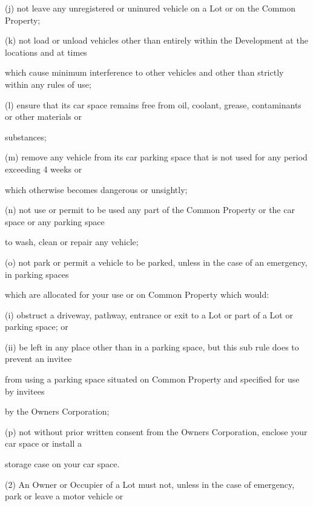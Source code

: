 \documentclass{article}
\begin{document}
{\fontsize{9.962}{1}(j) not leave any unregistered or uninured vehicle on a Lot or on the Common Property; }

{\fontsize{9.962}{1}(k) not load or unload vehicles other than entirely within the Development at the locations and at times }

{\fontsize{10.02}{1}which cause minimum interference to other vehicles and other than strictly within any rules of use; }

\newpage

{\fontsize{9.962}{1}(l) ensure that its car space remains free from oil, coolant, grease, contaminants or other materials or }

{\fontsize{10.02}{1}substances; }

{\fontsize{9.962}{1}(m) remove any vehicle from its car parking space that is not used for any period exceeding 4 weeks or }

{\fontsize{10.02}{1}which otherwise becomes dangerous or unsightly; }

{\fontsize{9.962}{1}(n) not use or permit to be used any part of the Common Property or the car space or any parking space }

{\fontsize{10.02}{1}to wash, clean or repair any vehicle; }

{\fontsize{9.962}{1}(o) not park or permit a vehicle to be parked, unless in the case of an emergency, in parking spaces }

{\fontsize{10.02}{1}which are allocated for your use or on Common Property which would: }

{\fontsize{9.962}{1}(i) obstruct a driveway, pathway, entrance or exit to a Lot or part of a Lot or parking space; or }

{\fontsize{9.962}{1}(ii) be left in any place other than in a parking space, but this sub rule does to prevent an invitee }

{\fontsize{10.02}{1}from using a parking space situated on Common Property and specified for use by invitees }

{\fontsize{10.02}{1}by the Owners Corporation; }

{\fontsize{9.962}{1}(p) not without prior written consent from the Owners Corporation, enclose your car space or install a }

{\fontsize{10.02}{1}storage case on your car space. }

{\fontsize{9.962}{1}(2) An Owner or Occupier of a Lot must not, unless in the case of emergency, park or leave a motor vehicle or }
\end{document}

